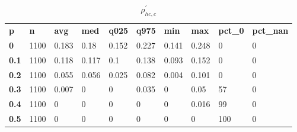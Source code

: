\begin{table}[h]
 \centering 
\footnotesize
\caption{$\rho_{hc,c}^\prime $}
\label{tab:alphahcc}
\begin{tabular}[h]{| l l l l l l l l l l|
    } \hline
\textbf{ p} & \textbf{ n} & \textbf{ avg} & \textbf{ med} & \textbf{ q025} & \textbf{ q975} & \textbf{ min} & \textbf{ max} & \textbf{ pct\_0} & \textbf{ pct\_nan}
           \\
  \textbf{  0} & 1100 & 0.183 &  0.18 & 0.152 & 0.227 & 0.141 & 0.248 &   0 & 0
           \\
  \textbf{0.1} & 1100 & 0.118 & 0.117 &   0.1 & 0.138 & 0.093 & 0.152 &   0 & 0
           \\
  \textbf{0.2} & 1100 & 0.055 & 0.056 & 0.025 & 0.082 & 0.004 & 0.101 &   0 & 0
           \\
  \textbf{0.3} & 1100 & 0.007 &     0 &     0 & 0.035 &     0 &  0.05 &  57 & 0
           \\
  \textbf{0.4} & 1100 &     0 &     0 &     0 &     0 &     0 & 0.016 &  99 & 0
           \\
  \textbf{0.5} & 1100 &     0 &     0 &     0 &     0 &     0 &     0 & 100 & 0
           \\
 \hline \end{tabular}
 \end{table}
